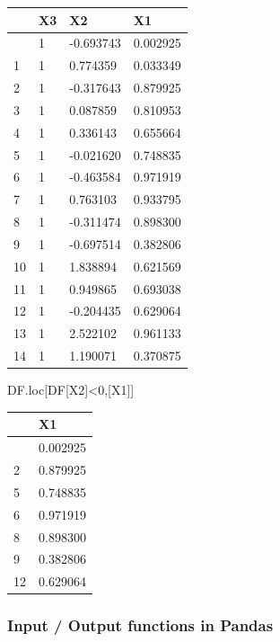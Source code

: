 \documentclass[
  a4paper,
  DIV=11,
  numbers=noendperiod]{scrreprt}
\newenvironment{Shaded}{\begin{snugshade}}{\end{snugshade}}
\newcommand{\DecValTok}[1]{\textcolor[rgb]{0.68,0.00,0.00}{#1}}
\newcommand{\NormalTok}[1]{\textcolor[rgb]{0.00,0.23,0.31}{#1}}
\newcommand{\OperatorTok}[1]{\textcolor[rgb]{0.37,0.37,0.37}{#1}}
\newcommand{\StringTok}[1]{\textcolor[rgb]{0.13,0.47,0.30}{#1}}
\begin{document}
\begin{longtable}[]{@{}llll@{}}
\toprule\noalign{}
& X3 & X2 & X1 \\
\midrule\noalign{}
\endhead
\bottomrule\noalign{}
\endlastfoot
0 & 1 & -0.693743 & 0.002925 \\
1 & 1 & 0.774359 & 0.033349 \\
2 & 1 & -0.317643 & 0.879925 \\
3 & 1 & 0.087859 & 0.810953 \\
4 & 1 & 0.336143 & 0.655664 \\
5 & 1 & -0.021620 & 0.748835 \\
6 & 1 & -0.463584 & 0.971919 \\
7 & 1 & 0.763103 & 0.933795 \\
8 & 1 & -0.311474 & 0.898300 \\
9 & 1 & -0.697514 & 0.382806 \\
10 & 1 & 1.838894 & 0.621569 \\
11 & 1 & 0.949865 & 0.693038 \\
12 & 1 & -0.204435 & 0.629064 \\
13 & 1 & 2.522102 & 0.961133 \\
14 & 1 & 1.190071 & 0.370875 \\
\end{longtable}

\begin{Shaded}
\begin{Highlighting}[]
\NormalTok{DF.loc[DF[}\StringTok{\textquotesingle{}X2\textquotesingle{}}\NormalTok{]}\OperatorTok{\textless{}}\DecValTok{0}\NormalTok{,[}\StringTok{\textquotesingle{}X1\textquotesingle{}}\NormalTok{]]}
\end{Highlighting}
\end{Shaded}

\begin{longtable}[]{@{}ll@{}}
\toprule\noalign{}
& X1 \\
\midrule\noalign{}
\endhead
\bottomrule\noalign{}
\endlastfoot
0 & 0.002925 \\
2 & 0.879925 \\
5 & 0.748835 \\
6 & 0.971919 \\
8 & 0.898300 \\
9 & 0.382806 \\
12 & 0.629064 \\
\end{longtable}

\subsubsection{Input / Output functions in
Pandas}\label{input-output-functions-in-pandas}
\end{document}

